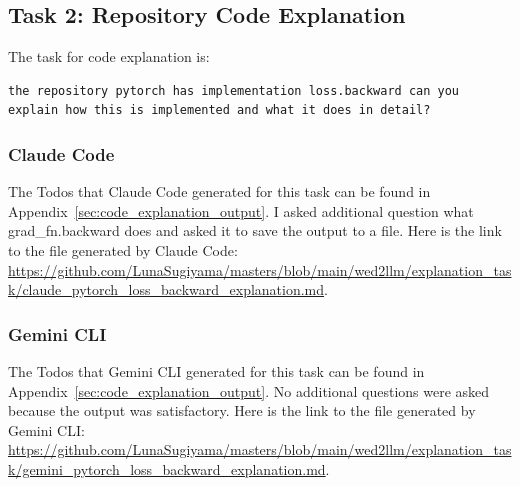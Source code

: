 \documentclass[9.5pt]{article}
\begin{document}
\subsection{Task 2: Repository Code Explanation}
The task for code explanation is:
\begin{verbatim}
the repository pytorch has implementation loss.backward can you explain how this is implemented and what it does in detail?
\end{verbatim}
\subsubsection{Claude Code}
The Todos that Claude Code generated for this task can be found in Appendix~\ref{sec:code_explanation_output}.
I asked additional question what grad\_fn.backward does and asked it to save the output to a file.
Here is the link to the file generated by Claude Code: \url{https://github.com/LunaSugiyama/masters/blob/main/wed2llm/explanation_task/claude_pytorch_loss_backward_explanation.md}.

\subsubsection{Gemini CLI}
The Todos that Gemini CLI generated for this task can be found in Appendix~\ref{sec:code_explanation_output}.
No additional questions were asked because the output was satisfactory.
Here is the link to the file generated by Gemini CLI: \url{https://github.com/LunaSugiyama/masters/blob/main/wed2llm/explanation_task/gemini_pytorch_loss_backward_explanation.md}.
\end{document}
